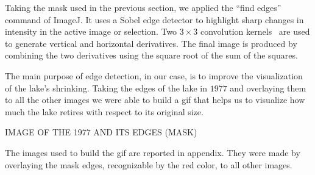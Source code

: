 Taking the mask used in the previous section, we applied the “find edges” command of ImageJ. 
It uses a Sobel edge detector to highlight sharp changes in intensity in the active image or selection. 
Two $3 \times 3$ convolution kernels~\cite{edges} are used to generate vertical and horizontal derivatives.
The final image is produced by combining the two derivatives using the square root of the sum of the squares. 

The main purpose of edge detection, in our case, is to improve the visualization of the lake’s shrinking. 
Taking the edges of the lake in $1977$ and overlaying them to all the other images we were able to build a gif that helps us to visualize how much the lake retires with respect to its original size. 

IMAGE OF THE 1977 AND ITS EDGES (MASK) 

The images used to build the gif are reported in appendix. They were made by overlaying the mask edges, recognizable by the red color, to all other images. 

